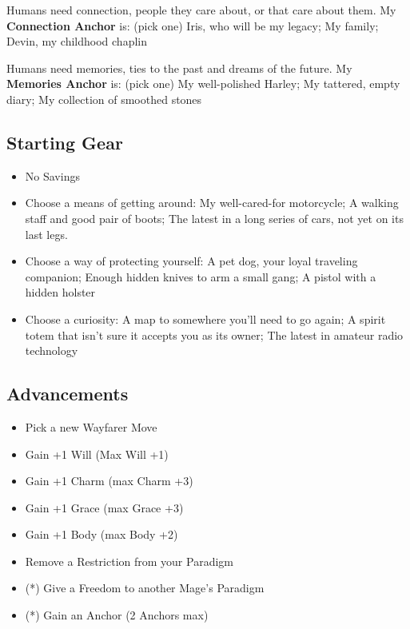 \documentclass[
]{memoir}
\begin{document}
Humans need connection, people they care about, or that care about them.
My \textbf{Connection Anchor} is: (pick one) Iris, who will be my
legacy; My family; Devin, my childhood chaplin

Humans need memories, ties to the past and dreams of the future. My
\textbf{Memories Anchor} is: (pick one) My well-polished Harley; My
tattered, empty diary; My collection of smoothed stones

\hypertarget{starting-gear-8}{%
\subsection{Starting Gear}\label{starting-gear-8}}

\begin{itemize}
\tightlist
\item
  No Savings
\item
  Choose a means of getting around: My well-cared-for motorcycle; A
  walking staff and good pair of boots; The latest in a long series of
  cars, not yet on its last legs.
\item
  Choose a way of protecting yourself: A pet dog, your loyal traveling
  companion; Enough hidden knives to arm a small gang; A pistol with a
  hidden holster
\item
  Choose a curiosity: A map to somewhere you'll need to go again; A
  spirit totem that isn't sure it accepts you as its owner; The latest
  in amateur radio technology
\end{itemize}

\hypertarget{advancements-8}{%
\subsection{Advancements}\label{advancements-8}}

\begin{itemize}
\tightlist
\item
  Pick a new Wayfarer Move
\item
  Gain +1 Will (Max Will +1)
\item
  Gain +1 Charm (max Charm +3)
\item
  Gain +1 Grace (max Grace +3)
\item
  Gain +1 Body (max Body +2)
\item
  Remove a Restriction from your Paradigm
\item
  (*) Give a Freedom to another Mage's Paradigm
\item
  (*) Gain an Anchor (2 Anchors max)
\end{itemize}
\end{document}
